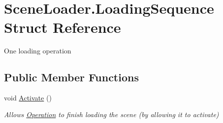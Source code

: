 \hypertarget{struct_scene_loader_1_1_loading_sequence}{\section{Scene\-Loader.\-Loading\-Sequence Struct Reference}
\label{struct_scene_loader_1_1_loading_sequence}
}


One loading operation  


\subsection*{Public Member Functions}
\begin{DoxyCompactItemize}
\item 
void \hyperlink{struct_scene_loader_1_1_loading_sequence_a971af981bc6a3a1db97654ad2dfbe9e4}{Activate} ()
\begin{DoxyCompactList}\small\item\em Allows \hyperlink{struct_scene_loader_1_1_loading_sequence_aa7b67661c21a69badba77f57a2ac5385}{Operation} to finish loading the scene (by allowing it to activate) \end{DoxyCompactList}\end{DoxyCompactItemize}
